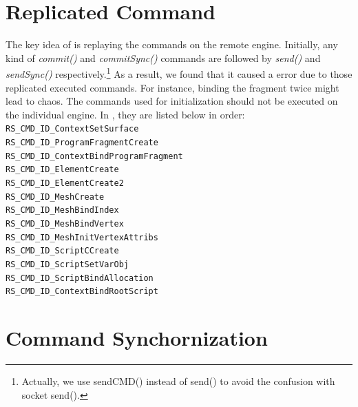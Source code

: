 \section{Replicated Command}
\label{s:rsListeningThread}
The key idea of \RRS{} is replaying the commands on the remote engine. Initially, any kind of \textit{commit()} and \textit{commitSync()} commands are followed by \textit{send()} and \textit{sendSync()} respectively.\footnote{Actually, we use sendCMD() instead of send() to avoid the confusion with socket send().} As a result, we found that it caused a error due to those replicated executed commands. For instance, binding the fragment twice might lead to chaos. The commands used for initialization should not be executed on the individual engine. In \Fountain{}, they are listed below in order:\\
\verb|RS_CMD_ID_ContextSetSurface|\\
\verb|RS_CMD_ID_ProgramFragmentCreate|\\
\verb|RS_CMD_ID_ContextBindProgramFragment|\\
\verb|RS_CMD_ID_ElementCreate|\\
\verb|RS_CMD_ID_ElementCreate2|\\
\verb|RS_CMD_ID_MeshCreate|\\
\verb|RS_CMD_ID_MeshBindIndex|\\
\verb|RS_CMD_ID_MeshBindVertex|\\
\verb|RS_CMD_ID_MeshInitVertexAttribs|\\
\verb|RS_CMD_ID_ScriptCCreate|\\
\verb|RS_CMD_ID_ScriptSetVarObj|\\
\verb|RS_CMD_ID_ScriptBindAllocation|\\
\verb|RS_CMD_ID_ContextBindRootScript|\\

\section{Command Synchornization}
\label{s:rsListeningThread}


